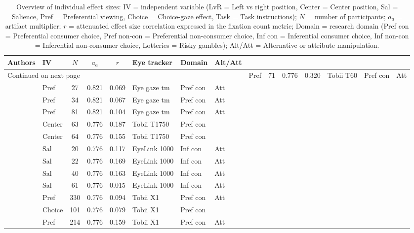 \begingroup\footnotesize
\begin{longtable}{p{5cm}lccclll}
\caption{Overview of individual effect sizes: IV = independent variable (LvR = Left vs right position, Center = Center position, Sal = Salience, Pref = Preferential viewing, Choice = Choice-gaze effect, Task = Task instructions); $N$ = number of participants; $a_a$ = artifact multiplier; $r$ = attenuated effect size correlation expressed in the fixation count metric; Domain = research domain (Pref con = Preferential consumer choice, Pref non-con = Preferential non-consumer choice, Inf con = Inferential consumer choice, Inf non-con = Inferential non-consumer choice, Lotteries = Risky gambles); Alt/Att = Alternative or attribute manipulation.} \\ 
  \hline
Authors & IV & $N$ & $a_a$ & $r$ & Eye tracker & Domain & Alt/Att \\ 
  \hline
\endhead
\hline
\multicolumn{8}{l}{\footnotesize Continued on next page}
\endfoot
\endlastfoot
 \hline
\cite{ares2014} & Pref & 71 & 0.776 & 0.320 & Tobii T60 & Pref con & Att \\ 
  \cite{ashby2015} & Pref & 27 & 0.821 & 0.069 & Eye gaze tm & Pref con & Att \\ 
  \cite{ashby2015} & Pref & 34 & 0.821 & 0.067 & Eye gaze tm & Pref con & Att \\ 
  \cite{ashby2015} & Pref & 81 & 0.821 & 0.104 & Eye gaze tm & Pref con & Att \\ 
  \cite{atalay2012a} & Center & 63 & 0.776 & 0.187 & Tobii T1750 & Pref con &  \\ 
  \cite{atalay2012a} & Center & 64 & 0.776 & 0.155 & Tobii T1750 & Pref con &  \\ 
  \cite{bagger2016} & Sal & 20 & 0.776 & 0.117 & EyeLink 1000 & Inf con & Att \\ 
  \cite{bagger2016} & Sal & 22 & 0.776 & 0.169 & EyeLink 1000 & Inf con & Att \\ 
  \cite{bagger2016} & Sal & 40 & 0.776 & 0.163 & EyeLink 1000 & Inf con & Att \\ 
  \cite{bagger2016} & Sal & 61 & 0.776 & 0.015 & EyeLink 1000 & Inf con & Att \\ 
  \cite{behe2014} & Pref & 330 & 0.776 & 0.094 & Tobii X1 & Pref con & Att \\ 
  \cite{behe2015} & Choice & 101 & 0.776 & 0.079 & Tobii X1 & Pref con &  \\ 
  \cite{behe2017} & Pref & 214 & 0.776 & 0.159 & Tobii X1 & Pref con & Att \\ 

\end{longtable}
